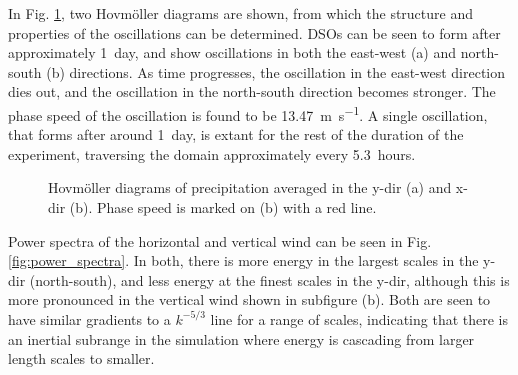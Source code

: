 \documentclass[11pt,a4paper]{article}
\begin{document}
In Fig. \ref{fig:hovmollers}, two Hovm{\"o}ller diagrams are shown, from which the structure and properties of the oscillations can be determined. DSOs can be seen to form after approximately \SI{1}{day}, and show oscillations in both the east-west (a) and north-south (b) directions. As time progresses, the oscillation in the east-west direction dies out, and the oscillation in the north-south direction becomes stronger. The phase speed of the oscillation is found to be \SI{13.47}{m.s^{-1}}. A single oscillation, that forms after around \SI{1}{day}, is extant for the rest of the duration of the experiment, traversing the domain approximately every \SI{5.3}{hours}.

\begin{figure}[hbt!]%
    \centering
    \qquad
    \caption{Hovm{\"o}ller diagrams of precipitation averaged in the y-dir (a) and x-dir (b). Phase speed is marked on (b) with a red line. }%
    \label{fig:hovmollers}%
\end{figure}

Power spectra of the horizontal and vertical wind can be seen in Fig. \ref{fig:power_spectra}. In both, there is more energy in the largest scales in the y-dir (north-south), and less energy at the finest scales in the y-dir, although this is more pronounced in the vertical wind shown in subfigure (b). Both are seen to have similar gradients to a $k^{-5/3}$ line for a range of scales, indicating that there is an inertial subrange in the simulation where energy is cascading from larger length scales to smaller.
\end{document}
